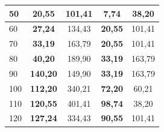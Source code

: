 \documentclass[a4paper,12pt]{article}
\begin{document}
\begin{table}[!htp]
\begin{tabular}{| p{} |c|c|c|c|}
            \hline
            50 & \textbf{20,55} & 101,41 & \textbf{7,74} & 38,20\\ 
            \hline
            60 & \textbf{27,24} & 134,43 & \textbf{20,55} & 101,41\\ \hline
            70 & \textbf{ 33,19} & 163,79 &  \textbf{20,55} & 101,41 \\ \hline
            80 & \textbf{40,20} & 189,90 &  \textbf{ 33,19} & 163,79\\ \hline
            90 & \textbf{140,20} & 149,90 &  \textbf{ 33,19} & 163,79\\ \hline
            100 & \textbf{112,20} & 340,21 & \textbf{72,20} & 60,21\\ 
            \hline
            110 & \textbf{120,55} & 401,41 & \textbf{98,74} & 38,20\\ 
            \hline
            120 & \textbf{127,24} & 334,43 & \textbf{90,55} & 101,41\\ \hline
        \end{tabular}
    \end{table}
\end{document}
